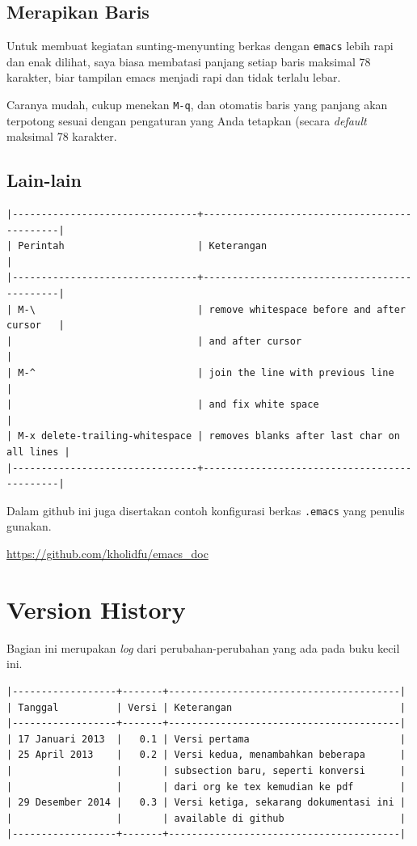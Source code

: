 \documentclass{article}
\begin{document}
\subsection{Merapikan Baris}
Untuk membuat kegiatan sunting-menyunting berkas dengan \verb=emacs=
lebih rapi dan enak dilihat, saya biasa membatasi panjang setiap baris
maksimal 78 karakter, biar tampilan emacs menjadi rapi dan tidak terlalu
lebar.

Caranya mudah, cukup menekan \verb=M-q=, dan otomatis baris yang panjang
akan terpotong sesuai dengan pengaturan yang Anda tetapkan (secara 
\emph{default} maksimal 78 karakter.


\subsection{Lain-lain}

\begin{verbatim}
|--------------------------------+---------------------------------------------|
| Perintah                       | Keterangan                                  |
|--------------------------------+---------------------------------------------|
| M-\                            | remove whitespace before and after cursor   |
|                                | and after cursor                            |
| M-^                            | join the line with previous line            |
|                                | and fix white space                         |
| M-x delete-trailing-whitespace | removes blanks after last char on all lines |
|--------------------------------+---------------------------------------------|
\end{verbatim}

Dalam github ini juga disertakan contoh konfigurasi berkas
\texttt{.emacs} yang penulis gunakan.

\url{https://github.com/kholidfu/emacs\_doc}

\section{Version History}
Bagian ini merupakan \emph{log} dari perubahan-perubahan yang ada pada buku
kecil ini.

\begin{verbatim}
|------------------+-------+----------------------------------------|
| Tanggal          | Versi | Keterangan                             |
|------------------+-------+----------------------------------------|
| 17 Januari 2013  |   0.1 | Versi pertama                          |
| 25 April 2013    |   0.2 | Versi kedua, menambahkan beberapa      |
|                  |       | subsection baru, seperti konversi      |
|                  |       | dari org ke tex kemudian ke pdf        |
| 29 Desember 2014 |   0.3 | Versi ketiga, sekarang dokumentasi ini |
|                  |       | available di github                    |
|------------------+-------+----------------------------------------|
\end{verbatim}
\end{document}
